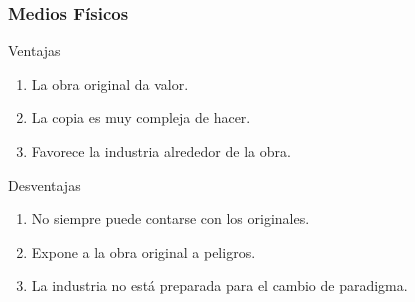 \documentclass{beamer}
\begin{document}
\begin{frame}
    \frametitle{Medios Físicos}
    \centering
    \begin{exampleblock}{Ventajas}
        \begin{enumerate}
            \item La obra original da valor.
            \item La copia es muy compleja de hacer.
            \item Favorece la industria alrededor de la obra.
        \end{enumerate}
    \end{exampleblock}
    \begin{block}{Desventajas}
        \begin{enumerate}
            \item No siempre puede contarse con los originales.
            \item Expone a la obra original a peligros.
            \item La industria no está preparada para el cambio de paradigma.
        \end{enumerate}
    \end{block}
\end{frame}
\end{document}
